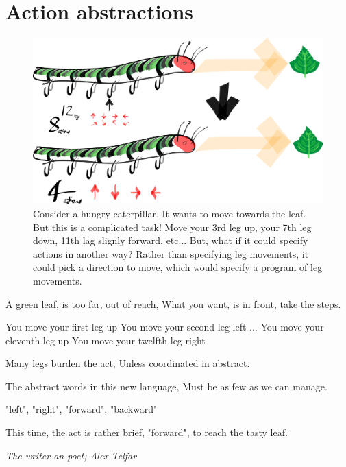 \section{Action abstractions}

\begin{figure}
\centering
\includegraphics[width=\textwidth,height=0.5\textheight]{../../pictures/drawings/caterpillar.png}
\caption{Consider a hungry caterpillar. It wants to move towards the leaf. But this is a complicated task! Move your 3rd leg up, your 7th leg down, 11th lag slignly forward, etc... But, what if it could specify actions in another way? Rather than specifying leg movements, it could pick a direction to move, which would specify a program of leg movements.}
\end{figure}


\epigraph{
A green leaf, is too far, out of reach,
What you want, is in front, take the steps.

You move your first leg up You move your second leg left ... You move your eleventh leg up You move your twelfth leg right

Many legs burden the act,
Unless coordinated in abstract.

The abstract words in this new language,
Must be as few as we can manage.

"left", "right", "forward", "backward"

This time, the act is rather brief,
"forward", to reach the tasty leaf.
}{\textit{The writer an poet; Alex Telfar}}
